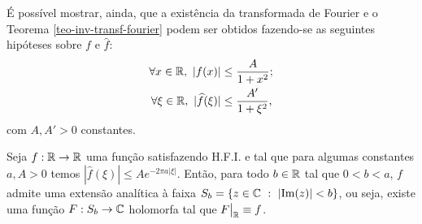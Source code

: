         É possível mostrar, ainda, que a existência da transformada de Fourier e o 
        Teorema \ref{teo-inv-transf-fourier} podem ser obtidos fazendo-se as seguintes hipóteses
        sobre $f$ e $\widehat{f}$:
        \begin{align*}
            \forall x\in\mathbb{R}, \ |f(x)| &\leq \frac{A}{1+x^2}; \\
            \forall \xi\in\mathbb{R}, \ |\widehat{f}(\xi)| &\leq \frac{A'}{1+\xi^2},
        \end{align*}
        com $A,A' > 0$ constantes.
        \begin{teorema}
        \label{teo-extensao-analitica-transf-decai-exp}
            Seja $f:\mathbb{R}\to\mathbb{R}$ uma função satisfazendo H.F.I. e tal que para algumas constantes $a,A > 0$
            temos $|\widehat{f}(\xi)| \leq Ae^{-2\pi a|\xi|}$. Então, para todo $b\in\mathbb{R}$ tal que 
            $0<b<a$, $f$ admite uma extensão analítica à faixa $S_b = \{ z\in\mathbb{C} \ : \ |\mathrm{Im}(z)| < b \}$,
            ou seja, existe uma função $F:S_b\to\mathbb{C}$ holomorfa tal que $F\big|_{\mathbb{R}} \equiv f$.
        \end{teorema}
